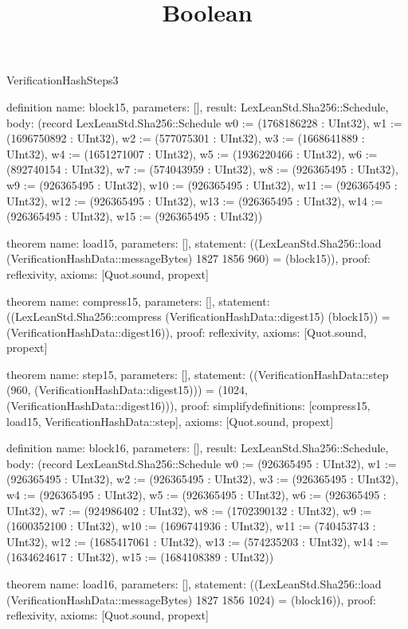 \begin{lexlean}{VerificationHashSteps3}
\title{Boolean}
\begin{semanticmodule}

definition{
  name: block15,
  parameters: [],
  result: LexLeanStd.Sha256::Schedule,
  body: (record LexLeanStd.Sha256::Schedule {w0 := (1768186228 : UInt32), w1 := (1696750892 : UInt32), w2 := (577075301 : UInt32), w3 := (1668641889 : UInt32), w4 := (1651271007 : UInt32), w5 := (1936220466 : UInt32), w6 := (892740154 : UInt32), w7 := (574043959 : UInt32), w8 := (926365495 : UInt32), w9 := (926365495 : UInt32), w10 := (926365495 : UInt32), w11 := (926365495 : UInt32), w12 := (926365495 : UInt32), w13 := (926365495 : UInt32), w14 := (926365495 : UInt32), w15 := (926365495 : UInt32)})
}

theorem{
  name: load15,
  parameters: [],
  statement: ((LexLeanStd.Sha256::load (VerificationHashData::messageBytes) 1827 1856 960) = (block15)),
  proof: reflexivity{},
  axioms: [Quot.sound, propext]
}

theorem{
  name: compress15,
  parameters: [],
  statement: ((LexLeanStd.Sha256::compress (VerificationHashData::digest15) (block15)) = (VerificationHashData::digest16)),
  proof: reflexivity{},
  axioms: [Quot.sound, propext]
}

theorem{
  name: step15,
  parameters: [],
  statement: ((VerificationHashData::step (960, (VerificationHashData::digest15))) = (1024, (VerificationHashData::digest16))),
  proof: simplify{definitions: [compress15, load15, VerificationHashData::step]},
  axioms: [Quot.sound, propext]
}

definition{
  name: block16,
  parameters: [],
  result: LexLeanStd.Sha256::Schedule,
  body: (record LexLeanStd.Sha256::Schedule {w0 := (926365495 : UInt32), w1 := (926365495 : UInt32), w2 := (926365495 : UInt32), w3 := (926365495 : UInt32), w4 := (926365495 : UInt32), w5 := (926365495 : UInt32), w6 := (926365495 : UInt32), w7 := (924986402 : UInt32), w8 := (1702390132 : UInt32), w9 := (1600352100 : UInt32), w10 := (1696741936 : UInt32), w11 := (740453743 : UInt32), w12 := (1685417061 : UInt32), w13 := (574235203 : UInt32), w14 := (1634624617 : UInt32), w15 := (1684108389 : UInt32)})
}

theorem{
  name: load16,
  parameters: [],
  statement: ((LexLeanStd.Sha256::load (VerificationHashData::messageBytes) 1827 1856 1024) = (block16)),
  proof: reflexivity{},
  axioms: [Quot.sound, propext]
}


\end{semanticmodule}
\end{lexlean}
